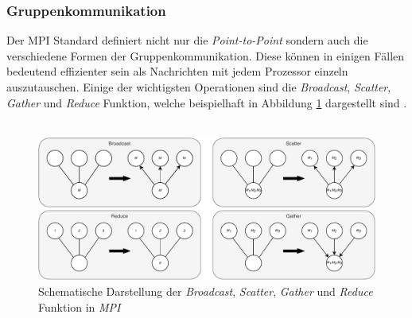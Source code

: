 \subsubsection{Gruppenkommunikation}
Der \ac{MPI} Standard definiert nicht nur die \emph{Point-to-Point} sondern auch die verschiedene Formen der Gruppenkommunikation. Diese können in einigen Fällen bedeutend effizienter sein als Nachrichten mit jedem Prozessor einzeln auszutauschen. Einige der wichtigsten Operationen sind die \emph{Broadcast}, \emph{Scatter}, \emph{Gather} und \emph{Reduce} Funktion, welche beispielhaft in Abbildung \ref{fig:mpi_group_communication} dargestellt sind \cite{dongarra1995introduction}.
\\\\
\begin{figure}[!h]
	\centering
	\includegraphics[width=1\textwidth]{./img/mpi_group_communication.pdf} 
	\caption{Schematische Darstellung der \emph{Broadcast}, \emph{Scatter}, \emph{Gather} und \emph{Reduce} Funktion in \emph{MPI}}
	\label{fig:mpi_group_communication}
\end{figure}

